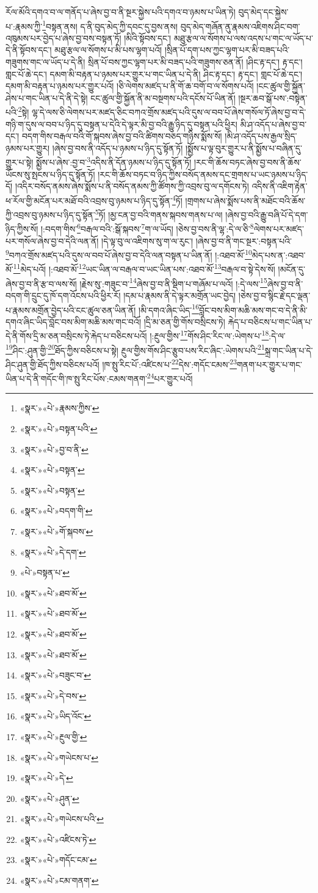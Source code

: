 རོལ་མོའི་དགའ་བ་ལ་གནོད་པ་ཞེས་བྱ་བ་ནི་སྔར་སྐྱེས་པའི་དགའ་བ་ཉམས་པ་ཡིན་ཏེ། བུད་མེད་དང་སྐྱེས་པ་:རྣམས་ཀྱི་\footnote{«སྣར་»«པེ་»རྣམས་ཀྱིས་}བསྟན་ནས། ད་ནི་བུད་མེད་ཀྱི་དབང་དུ་བྱས་ནས། བུད་མེད་གཞོན་ནུ་རྣམས་འཇིགས་ཤིང་བག་འཁུམས་པར་བྱེད་པ་ཞེས་བྱ་བས་བསྟན་ཏོ། །མིའི་སྟོབས་དང་། མཐུ་རྩལ་ལ་སོགས་པ་ལས་འདས་པ་གང་ལ་ཡོད་པ་དེ་ནི་སྟོབས་དང་། མཐུ་རྩལ་ལ་སོགས་པ་མི་པས་ལྷག་པའོ། །སྲིན་པོ་དག་པས་ཀྱང་ལྷག་པར་མི་བཟད་པའི་གཟུགས་གང་ལ་ཡོད་པ་དེ་ནི། སྲིན་པོ་བས་ཀྱང་ལྷག་པར་མི་བཟད་པའི་གཟུགས་ཅན་ནོ། །ཤིང་རྟ་དང་། རྟ་དང་། གླང་པོ་ཆེ་དང་། དམག་མི་བརྟན་པ་ཉམས་པར་གྱུར་པ་གང་ཡིན་པ་དེ་ནི། ཤིང་རྟ་དང་། རྟ་དང་། གླང་པོ་ཆེ་དང་། དམག་མི་བརྟན་པ་ཉམས་པར་གྱུར་པའོ། །ཅི་ལེགས་མཛད་པ་ནི་གོ་ཆ་བགོ་བ་ལ་སོགས་པའོ། །ངང་ཚུལ་གྱི་སྐྱོན་ཤེས་པ་གང་ཡིན་པ་དེ་ནི་དེ་སྟེ། ངང་ཚུལ་གྱི་སྐྱོན་ནི་མ་བསྔགས་པའི་དངོས་པོ་ཡིན་ནོ། །སྔར་ཆབ་སྒོ་པས་:བསྟེན་པའི་\footnote{«སྣར་»«པེ་»བསྟན་པའི་}སྟེ། ལྷ་དེ་ལས་ཅི་ལེགས་པར་མཛད་ཅིང་བཀའ་གྲོས་མཛད་པའི་དུས་ལ་བབ་པོ་ཞེས་གསོལ་ཏོ་ཞེས་བྱ་བ་དེ་གཉི་ག་དུས་ལ་བབ་པ་ཉིད་དུ་བསྟན་པ་དེའི་དེ་ལྟར་མི་བྱ་བའི་རྒྱུ་ཉིད་དུ་བསྟན་པའི་ཕྱིར། མི་ཤ་འདོད་པ་ཞེས་བྱ་བ་དང་། བདག་གིས་བརྒལ་བའི་གོ་སྐབས་ཞེས་བྱ་བའི་ཚིགས་བཅད་གཉིས་སྨོས་སོ། །མི་ཤ་འདོད་པས་རྒྱལ་སྲིད་ཉམས་པར་གྱུར། །ཞེས་བྱ་བས་ནི་འདོད་པ་ཉམས་པ་ཉིད་དུ་སྟོན་ཏོ། །སྨྱོས་པ་ལྟ་བུར་གྱུར་པ་ནི་སྨྱོས་པ་བཞིན་དུ་གྱུར་པ་སྟེ། སྨྱོས་པ་ཞེས་:བྱ་བ་\footnote{«སྣར་»«པེ་»བྱ་བ་ནི་}འདིས་ནི་དོན་ཉམས་པ་ཉིད་དུ་སྟོན་ཏོ། །རང་གི་ཆོས་བཏང་ཞེས་བྱ་བས་ནི་ཆོས་ཡོངས་སུ་སྤངས་པ་ཉིད་དུ་སྟོན་ཏོ། །རང་གི་ཆོས་བཏང་བ་ཉིད་ཀྱིས་བསོད་ནམས་དང་གྲགས་པ་ཡང་ཉམས་པ་ཉིད་དོ། །འདིར་བསོད་ནམས་ཞེས་སྨོས་པ་ནི་བསོད་ནམས་ཀྱི་ཚོགས་ཀྱི་འབྲས་བུ་ལ་དགོངས་ཏེ། འདིས་ནི་འཇིག་རྟེན་ཕ་རོལ་གྱི་མངོན་པར་མཐོ་བའི་འབྲས་བུ་ཉམས་པ་ཉིད་དུ་སྟོན་\footnote{«སྣར་»«པེ་»བསྟན་}ཏོ། །གྲགས་པ་ཞེས་སྨོས་པས་ནི་མཐོང་བའི་ཆོས་ཀྱི་འབྲས་བུ་ཉམས་པ་ཉིད་དུ་སྟོན་\footnote{«སྣར་»«པེ་»བསྟན་}ཏོ། །མྱ་ངན་བྱ་བའི་གནས་སྐབས་གནས་པ་ལ། །ཞེས་བྱ་བའི་རྒྱུ་བཞི་པོ་དེ་དག་ཉིད་ཀྱིས་སོ། །:བདག་གིས་\footnote{«སྣར་»«པེ་»བདག་གི་}བརྒལ་བའི་:སྒོ་སྐབས་\footnote{«སྣར་»«པེ་»གོ་སྐབས་}ག་ལ་ཡོད། །ཅེས་བྱ་བས་ནི་ལྷ་:དེ་ལ་ཅི་\footnote{«སྣར་»«པེ་»དེ་དག་}ལེགས་པར་མཛད་པར་གསོལ་ཞེས་བྱ་བ་དེའི་ལན་ནོ། །དེ་ལྟ་བུ་ལ་འཇིགས་སུ་ག་ལ་རུང་། །ཞེས་བྱ་བ་ནི་གང་སྔར་:བསྟན་པའི་\footnote{«པེ་»བསྟན་པ་}བཀའ་གྲོས་མཛད་པའི་དུས་ལ་བབ་པོ་ཞེས་བྱ་བ་དེའི་ལན་བསྟན་པ་ཡིན་ནོ། །:འཐབ་མོ་\footnote{«སྣར་»«པེ་»ཐབ་མོ་}མེད་པས་ན་:འཐབ་མོ་\footnote{«སྣར་»«པེ་»ཐབ་མོ་}མེད་པའོ། །:འཐབ་མོ་\footnote{«སྣར་»«པེ་»ཐབ་མོ་}ཡང་ཡིན་ལ་བརྒལ་བ་ཡང་ཡིན་པས་:འཐབ་མོ་\footnote{«སྣར་»«པེ་»ཐབ་མོ་}བརྒལ་བ་སྟེ་དེས་སོ། །མངོན་དུ་ཞེས་བྱ་བ་ནི་རྩ་བ་ལས་སོ། །རྗེས་སུ་:གཟུང་བ་\footnote{«སྣར་»«པེ་»བཟུང་བ་}ཞེས་བྱ་བ་ནི་སྡིག་པ་གཞོམ་པ་ལའོ། །:དེ་ལས་\footnote{«སྣར་»«པེ་»དེ་བས་}ཞེས་བྱ་བ་ནི་བདག་གི་དྲུང་དུ་ཁོ་དག་འོངས་པའི་ཕྱིར་རོ། །དམ་པ་རྣམས་ནི་དེ་ལྟར་མགྲོན་ཡང་བྱེད། །ཅེས་བྱ་བ་སྙིང་རྗེ་དང་ལྡན་པ་རྣམས་མགྲོན་བྱེད་པའི་ངང་ཚུལ་ཅན་ཡིན་ནོ། །མི་དགའ་ཞིང་ཡིད་\footnote{«སྣར་»«པེ་»ཡིད་འོང་}བློང་བས་མིག་མཆི་མས་གང་བ་དེ་ནི་མི་དགའ་ཞིང་ཡིད་བློང་བས་མིག་མཆི་མས་གང་བའོ། །དྲི་མ་ཅན་གྱི་གོས་བསྲིངས་ཏེ། རྐེད་པ་བཅིངས་པ་གང་ཡིན་པ་དེ་ནི་གོས་དྲི་མ་ཅན་བསྲིངས་ཏེ་རྐེད་པ་བཅིངས་པའོ། །:རྔུལ་གྱིས་\footnote{«སྣར་»«པེ་»རྔུལ་གྱི་}གོས་ཤིང་རིང་ལ་:ཡེགས་པ་\footnote{«སྣར་»«པེ་»གཡེངས་པ་}:དེ་ལ་\footnote{«སྣར་»«པེ་»དེ་}ཤིང་:ཤུན་གྱི་\footnote{«སྣར་»«པེ་»ཤུན་}ཐོད་ཀྱིས་བཅིངས་པ་སྟེ། རྔུལ་གྱིས་གོས་ཤིང་རྩུབ་པས་རིང་ཞིང་:ཡེགས་པའི་\footnote{«སྣར་»«པེ་»གཡེངས་པའི་}སྐྲ་གང་ཡིན་པ་དེ་ཤིང་ཤུན་གྱི་ཐོད་ཀྱིས་བཅིངས་པའོ། །ཁ་སྤུ་རིང་པོ་:འཛིངས་པ་\footnote{«སྣར་»«པེ་»འཛིངས་ཏེ་}དེས་:གདོང་ངམས་\footnote{«སྣར་»«པེ་»གདོང་ངམ་}གནག་པར་གྱུར་པ་གང་ཡིན་པ་དེ་ནི་གདོང་གི་ཁ་སྤུ་རིང་པོས་:ངམས་གནག་\footnote{«སྣར་»«པེ་»ངམ་གནག་}པར་གྱུར་པའོ། 